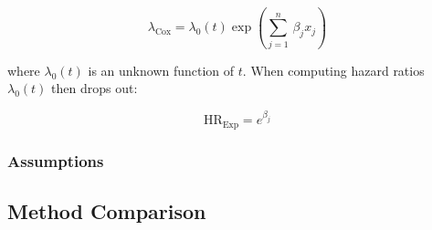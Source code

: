 \begin{equation}\label{eq:Survival:cox_lambda}
\lambda_{\text{Cox}} = \lambda_{0}\left(t\right) \exp\left(\sum_{j=1}^{n}\, \beta_{j} x_{j}\right)
\end{equation}

\noindent where $\lambda_{0}\left(t\right)$ is an unknown function of $t$.
When computing hazard ratios $\lambda_{0}\left(t\right)$ then drops out:

\begin{equation}\label{eq:Survival:cox_HR}
\text{HR}_{\text{Exp}} = e^{\beta_{j}}
\end{equation}


\subsubsection{Assumptions}
\label{additional:Survival:cox:assumptions}

\subsection{Method Comparison}
\label{additional:Survival:comp}

